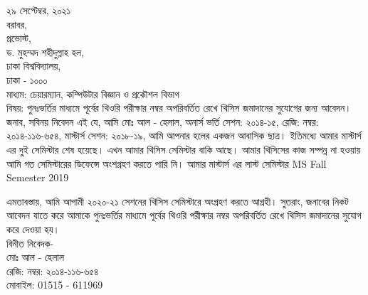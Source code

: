 \documentclass[a4paper]{article}
\begin{document}
\fontsize{17}{20}
\selectfont
\vfill
\noindent
২৯ সেপ্টেম্বর, ২০২১\\ 

\noindent
বরাবর,\\ 
প্রভোস্ট,\\
ড. মুহম্মদ শহীদুল্লাহ হল,\\
ঢাকা বিশ্ববিদ্যালয়,\\
ঢাকা - ১০০০\\

\noindent
মাধ্যম: চেয়ারম্যান, কম্পিউটার বিজ্ঞান ও প্রকৌশল বিভাগ\\

\noindent
বিষয়: পুনঃভর্তির মাধ্যমে পূর্বের থিওরি পরীক্ষার নম্বর অপরিবর্তিত রেখে থিসিস জমাদানের  সুযোগের জন্য আবেদন।\\

\noindent
জনাব,
সবিনয় নিবেদন এই যে, আমি মোঃ আল - হেলাল, অনার্স ভর্তি সেশন: ২০১৪-১৫, রেজি: নম্বর: ২০১৪-১১৬-৬৫৪, মাস্টার্স সেশন: ২০১৮-১৯, আমি আপনার হলের  একজন আবাসিক ছাত্র। ইতিমধ্যে আমার মাস্টার্স এর দুই সেমিস্টার শেষ হয়েছে। এখন আমার থিসিস সেমিস্টার বাকি আছে। আমার থিসিসের কাজ সম্পন্ন না হওয়ায় আমি গত সেমিস্টারের ডিফেন্সে অংশগ্রহণ করতে পারি নি। আমার মাস্টার্স এর লাস্ট সেমিস্টার   MS Fall Semester 2019

\noindent
এমতাবস্তায়, আমি আগামী ২০২০-২১ সেশনের থিসিস সেমিস্টারে অংগ্রহণ করতে আগ্রহী। সুতরাং, জনাবের নিকট আবেদন যাতে করে আমাকে পুনঃভর্তির মাধ্যমে পূর্বের থিওরি পরীক্ষার নম্বর অপরিবর্তিত রেখে থিসিস জমাদানের  সুযোগ করে দেওয়া হয়।\\



\noindent
বিনীত নিবেদক-\\
মোঃ আল - হেলাল\\
রেজি: নম্বর: ২০১৪-১১৬-৬৫৪\\
মোবাইল:  01515 - 611969
\end{document}
